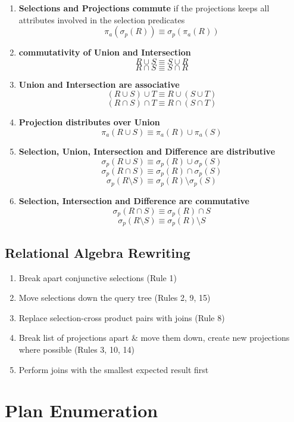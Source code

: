\begin{enumerate}
    \item \textbf{Selections and Projections commute } if the projections keeps all attributes involved in the selection predicates
    \[ \pi_a(\sigma_p(R)) \equiv \sigma_p(\pi_a(R)) \] 
    
    \item \textbf{commutativity of Union and Intersection}
    \[ R \cup S \equiv S \cup R  \]
    \[ R \cap S \equiv S \cap R  \]
    
    \item \textbf{Union and Intersection are associative}
    \[ (R \cup S) \cup T \equiv R \cup (S \cup T) \]
    \[ (R \cap S) \cap T \equiv R \cap (S \cap T) \]
    
    \item \textbf{Projection distributes over Union}
    \[ \pi_{a}(R \cup S) \equiv \pi_{a}(R) \cup \pi_{a}(S) \] 
    
    \item \textbf{Selection, Union, Intersection and Difference are distributive}
    \[ \sigma_{p}(R \cup S) \equiv \sigma_{p}(R) \cup \sigma_{p}(S) \] 
    \[ \sigma_{p}(R \cap S) \equiv \sigma_{p}(R) \cap \sigma_{p}(S) \] 
    \[ \sigma_{p}(R \setminus S) \equiv \sigma_{p}(R) \setminus \sigma_{p}(S) \] 
    
    \item \textbf{Selection, Intersection and Difference are commutative}
    \[ \sigma_{p}(R \cap S) \equiv \sigma_p(R) \cap S \] 
    \[ \sigma_{p}(R \setminus S) \equiv \sigma_p(R) \setminus S \] 
\end{enumerate}

\subsection{Relational Algebra Rewriting}
\begin{enumerate}
    \item Break apart conjunctive selections (Rule 1)
    \item Move selections down the query tree (Rules 2, 9, 15)
    \item Replace selection-cross product pairs with joins (Rule 8)
    \item Break list of projections apart \& move them down, create new projections where possible (Rules 3, 10, 14)
    \item Perform joins with the smallest expected result first
\end{enumerate}

\section{Plan Enumeration}
